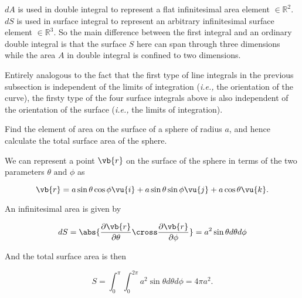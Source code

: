 \documentclass[english,a4paper,12pt]{report}
\begin{document}
\(dA\) is used in double integral to represent a flat infinitesimal area element \(\in \mathbb{R}^2\). \(dS\) is used in surface integral to represent an arbitrary infinitesimal surface element \(\in \mathbb{R}^3 \). So the main difference between the first integral and an ordinary double integral is that the surface \(S\) here can span through three dimensions while the area \(A\) in double integral is confined to two dimensions.

Entirely analogous to the fact that the first type of line integrals in the previous subsection is independent of the limits of integration (\textit{i.e.,} the orientation of the curve), the firsty type of the four surface integrals above is also independent of the orientation of the surface (\textit{i.e.,} the limits of integration). 

{Find the element of area on the surface of a sphere of radius \(a\), and hence calculate the total surface area of the sphere.}
{We can represent a point \(\vb{r} \)  on the surface of the sphere in terms of the two parameters \(\theta \text { and } \phi \) as

\begin{equation}
	\vb{r} = a \sin \theta \cos \phi \vu{i} + a \sin \theta \sin \phi \vu{j} + a \cos \theta \vu{k} .
\end{equation}

An infinitesimal area is given by 

\begin{equation}
	dS = \abs{\frac{\partial \vb{r} }{\partial \theta } \cross \frac{\partial \vb{r} }{\partial \phi } } = a^2\sin \theta d \theta d \phi 
\end{equation}

And the total surface area is then 

\begin{equation}
	S = \int_{0}^{\pi }\int_{0}^{2\pi } a^2 \sin \theta d \theta d \phi = 4\pi a^2.    
\end{equation}
} 
\end{document}
